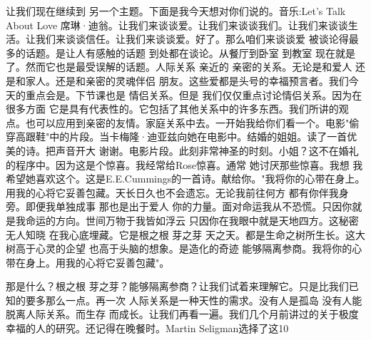 让我们现在继续到 另一个主题。下面是我今天想对你们说的。音乐:Let's Talk About Love 席琳·迪翁。让我们来谈谈爱。让我们来谈谈我们。让我们来谈谈生活。让我们来谈谈信任。让我们来谈谈爱。好了。那么咱们来谈谈爱 被谈论得最多的话题。是让人有感触的话题 到处都在谈论。从餐厅到卧室 到教室 现在就是了。然而它也是最受误解的话题。人际关系 亲近的 亲密的关系。无论是和爱人 还是和家人。还是和亲密的灵魂伴侣 朋友。这些爱都是头号的幸福预言者。我们今天的重点会是。下节课也是 情侣关系。但是 我们仅仅重点讨论情侣关系。因为在很多方面 它是具有代表性的。它包括了其他关系中的许多东西。我们所讲的观点。也可以应用到亲密的友情。家庭关系中去。一开始我给你们看一个。电影"偷穿高跟鞋"中的片段。当卡梅隆·迪亚兹向她在电影中。结婚的姐姐。读了一首优美的诗。把声音开大 谢谢。电影片段。此刻非常神圣的时刻。小姐？这不在婚礼的程序中。因为这是个惊喜。我经常给Rose惊喜。通常 她讨厌那些惊喜。我想 我希望她喜欢这个。这是E.E.Cummings的一首诗。献给你。"我将你的心带在身上。用我的心将它妥善包藏。天长日久也不会遗忘。无论我前往何方 都有你伴我身旁。即便我单独成事 那也是出于爱人 你的力量。面对命运我从不恐慌。只因你就是我命运的方向。世间万物于我皆如浮云 只因你在我眼中就是天地四方。这秘密无人知晓 在我心底埋藏。它是根之根 芽之芽 天之天。都是生命之树所生长。这大树高于心灵的企望 也高于头脑的想象。是造化的奇迹 能够隔离参商。我将你的心带在身上。用我的心将它妥善包藏"。 

那是什么？根之根 芽之芽？能够隔离参商？让我们试着来理解它。只是比我们已知的要多那么一点。再一次 人际关系是一种天性的需求。没有人是孤岛 没有人能脱离人际关系。而生存 而成长。让我们再看一遍。我们几个月前讲过的关于极度幸福的人的研究。还记得在晚餐时。Martin Seligman选择了这10%

